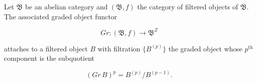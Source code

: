 Let $\mathfrak{B}$ be an abelian category and $(\mathfrak{B}, f)$ the category of filtered objects of $\mathfrak{B}$. The associated graded object functor

$$Gr : (\mathfrak{B}, f) \rightarrow \mathfrak{B}^Z$$

attaches to a filtered object $B$ with filtration $\{B^{(p)}\}$ the graded object whose $p^{\text{th}}$ component is the subquotient

$$(Gr \, B)^p = B^{(p)} / B^{(p-1)}.$$
